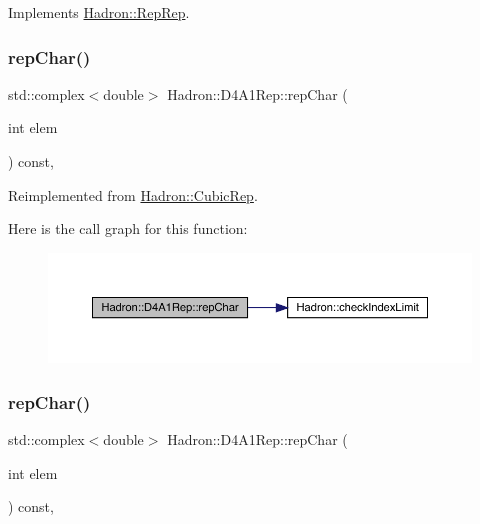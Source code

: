 Implements \mbox{\hyperlink{structHadron_1_1RepRep_ab3213025f6de249f7095892109575fde}{Hadron\+::\+Rep\+Rep}}.

\mbox{\label{structHadron_1_1D4A1Rep_a45938f0cd557c639eedba39b63fabe29}} 
\subsubsection{\texorpdfstring{repChar()}{repChar()}\hspace{0.1cm}{\footnotesize\ttfamily [1/3]}}
{\footnotesize\ttfamily std\+::complex$<$double$>$ Hadron\+::\+D4\+A1\+Rep\+::rep\+Char (\begin{DoxyParamCaption}\item[{int}]{elem }\end{DoxyParamCaption}) const\hspace{0.3cm}{\ttfamily [inline]}, {\ttfamily [virtual]}}



Reimplemented from \mbox{\hyperlink{structHadron_1_1CubicRep_af45227106e8e715e84b0af69cd3b36f8}{Hadron\+::\+Cubic\+Rep}}.

Here is the call graph for this function\+:
\nopagebreak
\begin{figure}[H]
\begin{center}
\leavevmode
\includegraphics[width=350pt]{d8/d02/structHadron_1_1D4A1Rep_a45938f0cd557c639eedba39b63fabe29_cgraph}
\end{center}
\end{figure}
\mbox{\label{structHadron_1_1D4A1Rep_a45938f0cd557c639eedba39b63fabe29}} 
\subsubsection{\texorpdfstring{repChar()}{repChar()}\hspace{0.1cm}{\footnotesize\ttfamily [2/3]}}
{\footnotesize\ttfamily std\+::complex$<$double$>$ Hadron\+::\+D4\+A1\+Rep\+::rep\+Char (\begin{DoxyParamCaption}\item[{int}]{elem }\end{DoxyParamCaption}) const\hspace{0.3cm}{\ttfamily [inline]}, {\ttfamily [virtual]}}



